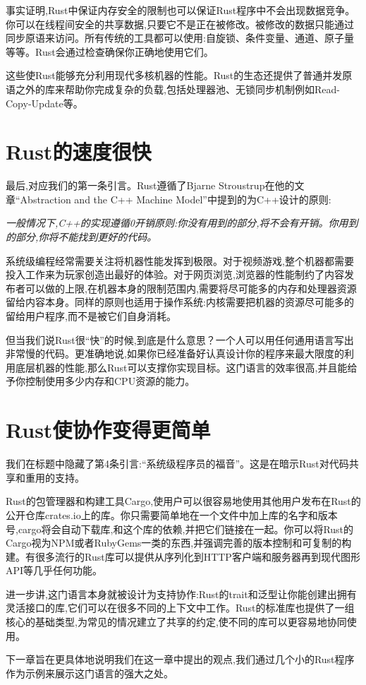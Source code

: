 事实证明,Rust中保证内存安全的限制也可以保证Rust程序中不会出现数据竞争。你可以在线程间安全的共享数据,只要它不是正在被修改。被修改的数据只能通过同步原语来访问。所有传统的工具都可以使用:自旋锁、条件变量、通道、原子量等等。Rust会通过检查确保你正确地使用它们。

这些使Rust能够充分利用现代多核机器的性能。Rust的生态还提供了普通并发原语之外的库来帮助你完成复杂的负载,包括处理器池、无锁同步机制例如Read-Copy-Update等。

\section{Rust的速度很快}
最后,对应我们的第一条引言。Rust遵循了Bjarne Stroustrup在他的文章“Abstraction and the C++ Machine Model”中提到的为C++设计的原则:

\emph{一般情况下,C++的实现遵循0开销原则:你没有用到的部分,将不会有开销。你用到的部分,你将不能找到更好的代码。}

系统级编程经常需要关注将机器性能发挥到极限。对于视频游戏,整个机器都需要投入工作来为玩家创造出最好的体验。对于网页浏览,浏览器的性能制约了内容发布者可以做的上限,在机器本身的限制范围内,需要将尽可能多的内存和处理器资源留给内容本身。同样的原则也适用于操作系统:内核需要把机器的资源尽可能多的留给用户程序,而不是被它们自身消耗。

但当我们说Rust很“快”的时候,到底是什么意思？一个人可以用任何通用语言写出非常慢的代码。更准确地说,如果你已经准备好认真设计你的程序来最大限度的利用底层机器的性能,那么Rust可以支撑你实现目标。这门语言的效率很高,并且能给予你控制使用多少内存和CPU资源的能力。

\section{Rust使协作变得更简单}
我们在标题中隐藏了第4条引言:“系统级程序员的福音”。这是在暗示Rust对代码共享和重用的支持。

Rust的包管理器和构建工具Cargo,使用户可以很容易地使用其他用户发布在Rust的公开仓库crates.io上的库。你只需要简单地在一个文件中加上库的名字和版本号,cargo将会自动下载库,和这个库的依赖,并把它们链接在一起。你可以将Rust的Cargo视为NPM或者RubyGems一类的东西,并强调完善的版本控制和可复制的构建。有很多流行的Rust库可以提供从序列化到HTTP客户端和服务器再到现代图形API等几乎任何功能。

进一步讲,这门语言本身就被设计为支持协作:Rust的trait和泛型让你能创建出拥有灵活接口的库,它们可以在很多不同的上下文中工作。Rust的标准库也提供了一组核心的基础类型,为常见的情况建立了共享的约定,使不同的库可以更容易地协同使用。

下一章旨在更具体地说明我们在这一章中提出的观点,我们通过几个小的Rust程序作为示例来展示这门语言的强大之处。
